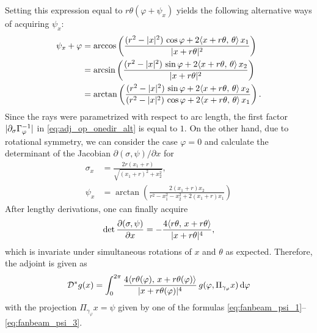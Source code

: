 \documentclass{amsart}
\renewcommand*{\phi}{\varphi}
\begin{document}
\begin{example}
 Setting this expression equal to $r\theta(\phi + \psi_x)$ yields the following alternative ways of acquiring $\psi_x$:
 \begin{align}
  \psi_x + \phi
  \label{eq:fanbeam_psi_1}
  &= \arccos\left(\frac{(r^2 - \ABS{x}^2)\, \cos\phi + 2 \INNER{x + r\theta}{\theta}\, x_1}{\ABS{x + r\theta}^2} \right) \\
  \label{eq:fanbeam_psi_2}
  &= \arcsin\left(\frac{(r^2 - \ABS{x}^2)\, \sin\phi + 2 \INNER{x + r\theta}{\theta}\, x_2}{\ABS{x + r\theta}^2} \right) \\
  \label{eq:fanbeam_psi_3}
  &= \arctan\left(\frac{(r^2 - \ABS{x}^2)\, \sin\phi + 2 \INNER{x + r\theta}{\theta}\, x_2}{
  (r^2 - \ABS{x}^2)\, \cos\phi + 2 \INNER{x + r\theta}{\theta}\, x_1} \right).
 \end{align}
 Since the rays were parametrized with respect to arc length, the first factor $\ABS{\partial_\sigma\Gamma_\phi^{-1}}$ in 
 \eqref{eq:adj_op_onedir_alt} is equal to $1$. On the other hand, due to rotational symmetry, we can consider the case $\phi=0$ and 
 calculate  the determinant of the Jacobian $\partial(\sigma,\psi)/\partial x$ for
 \begin{align*}
  \sigma_x &= \frac{2r (x_1 + r)}{\sqrt{(x_1 + r)^2 + x_2^2}}, \\
  \psi_x &= \arctan\left(\frac{2 (x_1 + r) x_2}{r^2 - x_1^2 - x_2^2 + 2 (x_1 + r) x_1} \right)
 \end{align*}
 After lengthy derivations, one can finally acquire
 \begin{equation*}
  \operatorname*{det} \frac{\partial(\sigma,\psi)}{\partial x} = - \frac{4 \langle r\theta,\,x+r\theta\rangle}{|x+r\theta|^4},
 \end{equation*}
 which is invariate under simultaneous rotations of $x$ and $\theta$ as expected. Therefore, the adjoint is given as
 \begin{equation}
  \OPD^* g(x) = \int_0^{2\pi} \frac{4 \INNER{r\theta(\phi)}{x+r\theta(\phi)}}{\ABS{x+r\theta(\phi)}^4}\, g(\phi, \Pi_{\gamma_\phi}x) \, \D 
\phi
 \end{equation} 
 with the projection $\Pi_{\gamma_\phi}x = \psi$ given by one of the formulas \eqref{eq:fanbeam_psi_1}--\eqref{eq:fanbeam_psi_3}.

\end{example}
\end{document}
